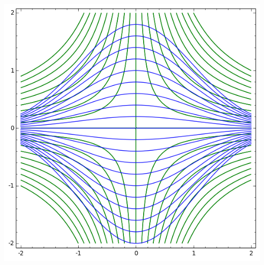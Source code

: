 \documentclass[class=report,crop=false]{standalone}
\begin{document}
\begin{center}
\includegraphics[scale=0.35]{figures/equadiff-courbe4.png} \\ 
\end{center}
\end{document}
